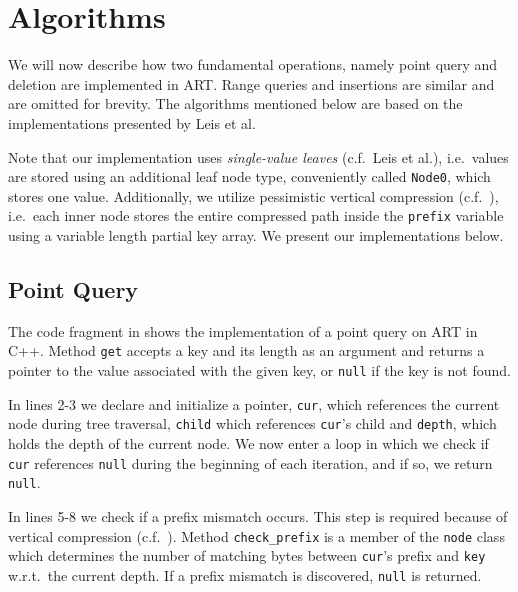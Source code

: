 \documentclass[abstracton,12pt]{scrartcl}
\theoremstyle{definition}
\begin{document}
\newpage

\section{Algorithms}\label{sec:algorithms}

\vspace{-1mm}
We will now describe how two fundamental operations, namely
point query and deletion are implemented in ART.
Range queries and insertions are similar and are omitted for brevity.
The algorithms mentioned below are based on the implementations presented by
Leis et al. 

Note that our implementation uses
\textit{single-value leaves} (c.f.\ Leis et al.), 
i.e.\ values are stored using an additional leaf node type, conveniently
called \texttt{Node0}, which stores one value. Additionally, we utilize
pessimistic vertical compression (c.f.\ ),
i.e.\ each inner node stores the entire compressed path inside the 
\texttt{prefix} variable using a variable length partial key array. 
We present our implementations below.

\vspace{-3mm}
\subsection{Point Query}\label{sec:point-query}

The code fragment in  shows the implementation of a 
point query on ART in C++. Method \texttt{get} accepts a key and its length
as an argument and returns a pointer to the value associated with the given 
key, or \texttt{null} if the key is not found.

In lines 2-3 we declare and initialize a pointer, \texttt{cur}, which references
the current node during tree traversal, \texttt{child} which references 
\texttt{cur}'s child and \texttt{depth}, which holds the depth
of the current node. We now enter a loop in which we check if \texttt{cur} 
references \texttt{null} during the beginning of each iteration, and if so, 
we return \texttt{null}.

In lines 5-8 we check if a prefix mismatch occurs. This step is required
because of vertical compression (c.f.\ ).
Method \texttt{check\_prefix} is a member of the \texttt{node} class which
determines the number of matching bytes between \texttt{cur}'s prefix
and \texttt{key} w.r.t.\ the current depth. If a prefix mismatch is discovered,
\texttt{null} is returned.
\end{document}
